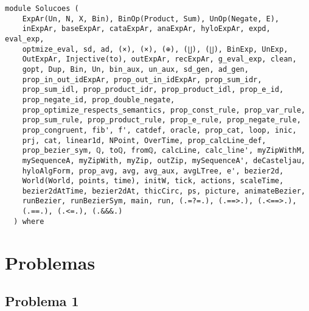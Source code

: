 \label{module:Solucoes}
\haddockbeginheader
{\haddockverb\begin{verbatim}
module Solucoes (
    ExpAr(Un, N, X, Bin), BinOp(Product, Sum), UnOp(Negate, E),
    inExpAr, baseExpAr, cataExpAr, anaExpAr, hyloExpAr, expd, eval_exp,
    optmize_eval, sd, ad, (×), (×), (⊕), (∐), (∐), BinExp, UnExp,
    OutExpAr, Injective(to), outExpAr, recExpAr, g_eval_exp, clean,
    gopt, Dup, Bin, Un, bin_aux, un_aux, sd_gen, ad_gen,
    prop_in_out_idExpAr, prop_out_in_idExpAr, prop_sum_idr,
    prop_sum_idl, prop_product_idr, prop_product_idl, prop_e_id,
    prop_negate_id, prop_double_negate,
    prop_optimize_respects_semantics, prop_const_rule, prop_var_rule,
    prop_sum_rule, prop_product_rule, prop_e_rule, prop_negate_rule,
    prop_congruent, fib', f', catdef, oracle, prop_cat, loop, inic,
    prj, cat, linear1d, NPoint, OverTime, prop_calcLine_def,
    prop_bezier_sym, ℚ, toℚ, fromℚ, calcLine, calc_line', myZipWithM,
    mySequenceA, myZipWith, myZip, outZip, mySequenceA', deCasteljau,
    hyloAlgForm, prop_avg, avg, avg_aux, avgLTree, e', bezier2d,
    World(World, points, time), initW, tick, actions, scaleTime,
    bezier2dAtTime, bezier2dAt, thicCirc, ps, picture, animateBezier,
    runBezier, runBezierSym, main, run, (.=?=.), (.==>.), (.<==>.),
    (.==.), (.<=.), (.&&&.)
  ) where\end{verbatim}}
\haddockendheader

\section{Problemas}
\subsection{Problema 1}
